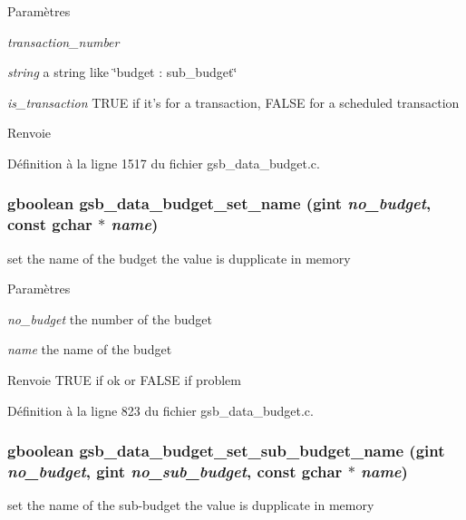 \begin{DoxyParams}{Paramètres}
\item[{\em transaction\_\-number}]\item[{\em string}]a string like \char`\"{}budget : sub\_\-budget\char`\"{} \item[{\em is\_\-transaction}]TRUE if it's for a transaction, FALSE for a scheduled transaction\end{DoxyParams}
\begin{DoxyReturn}{Renvoie}

\end{DoxyReturn}


Définition à la ligne 1517 du fichier gsb\_\-data\_\-budget.c.

\subsubsection[{gsb\_\-data\_\-budget\_\-set\_\-name}]{\setlength{\rightskip}{0pt plus 5cm}gboolean gsb\_\-data\_\-budget\_\-set\_\-name (gint {\em no\_\-budget}, \/  const gchar $\ast$ {\em name})}\label{gsb__data__budget_8h_ac0f000932feafe9d5c50784eb8fdfd30}
set the name of the budget the value is dupplicate in memory


\begin{DoxyParams}{Paramètres}
\item[{\em no\_\-budget}]the number of the budget \item[{\em name}]the name of the budget\end{DoxyParams}
\begin{DoxyReturn}{Renvoie}
TRUE if ok or FALSE if problem 
\end{DoxyReturn}


Définition à la ligne 823 du fichier gsb\_\-data\_\-budget.c.

\subsubsection[{gsb\_\-data\_\-budget\_\-set\_\-sub\_\-budget\_\-name}]{\setlength{\rightskip}{0pt plus 5cm}gboolean gsb\_\-data\_\-budget\_\-set\_\-sub\_\-budget\_\-name (gint {\em no\_\-budget}, \/  gint {\em no\_\-sub\_\-budget}, \/  const gchar $\ast$ {\em name})}\label{gsb__data__budget_8h_abca491922f1ff328b1bcfe6022209d29}
set the name of the sub-\/budget the value is dupplicate in memory


